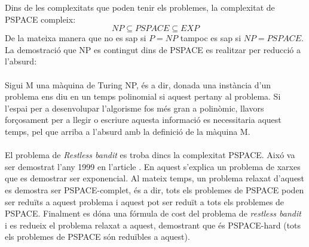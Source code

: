 
	Dins de les complexitats que poden tenir els problemes, la complexitat de PSPACE compleix:
	\[
	{NP} \subseteq PSPACE \subseteq {EXP} %
	\]
	De la mateixa manera que no es sap si $P = NP$ tampoc es sap si $NP = PSPACE$. La demostració que NP es contingut dins de
	PSPACE es realitzar per reducció a l'absurd:\\
	\\
	 Sigui M una màquina de Turing NP, és a dir, donada una instància d'un problema ens diu en un temps 
	polinomial si aquest pertany al problema. Si l'espai per a desenvolupar l'algorisme fos més gran a polinòmic, llavors forçosament
	per a llegir o escriure aquesta informació es necessitaria aquest temps, pel que arriba a l'absurd amb la definició de la màquina M. %
	\\
	\\
	El problema de \textit{Restless bandit} es troba dincs la complexitat PSPACE. Aixó va ser demostrat l'any 1999 en l'article \cite{pspace}.%
	En aquest s'explica un problema de xarxes que es demostrar ser exponencial. Al mateix temps, un problema relaxat d'aquest
	es demostra ser PSPACE-complet, és a dir, tots els problemes de PSPACE poden ser reduïts a aquest problema i aquest pot
	ser reduït a tots els problemes de PSPACE. Finalment es dóna una fórmula de cost del problema de \textit{restless bandit} i
	es redueix el problema relaxat a aquest, demostrant que és PSPACE-hard (tots els problemes de PSPACE són
	reduïbles a aquest). %
	
